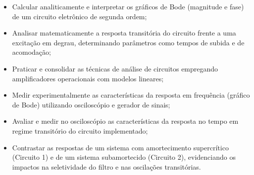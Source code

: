 \begin{itemize}
	\item Calcular analiticamente e interpretar os gráficos de Bode (magnitude e fase) de um circuito eletrônico de segunda ordem;
	\item Analisar matematicamente a resposta transitória do circuito frente a uma excitação em degrau, determinando parâmetros como tempos de subida e de acomodação;
	\item Praticar e consolidar as técnicas de análise de circuitos empregando amplificadores operacionais com modelos lineares;
	\item Medir experimentalmente as características da resposta em frequência (gráfico de Bode) utilizando osciloscópio e gerador de sinais;
	\item Avaliar e medir no osciloscópio as características da resposta no tempo em regime transitório do circuito implementado;
	\item Contrastar as respostas de um sistema com amortecimento supercrítico (Circuito 1) e de um sistema subamortecido (Circuito 2), evidenciando os impactos na seletividade do filtro e nas oscilações transitórias.
\end{itemize}